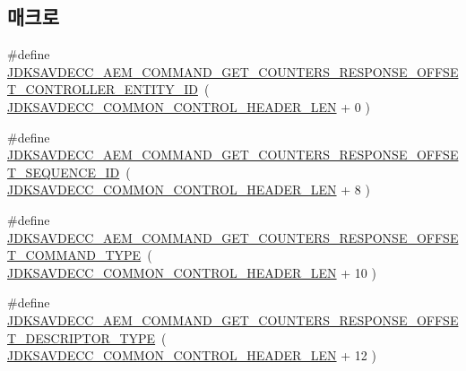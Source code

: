 \subsection*{매크로}
\begin{DoxyCompactItemize}
\item 
\#define \hyperlink{group__command__get__counters__response_gab36093ae45b6882f4b873a3584339793}{J\+D\+K\+S\+A\+V\+D\+E\+C\+C\+\_\+\+A\+E\+M\+\_\+\+C\+O\+M\+M\+A\+N\+D\+\_\+\+G\+E\+T\+\_\+\+C\+O\+U\+N\+T\+E\+R\+S\+\_\+\+R\+E\+S\+P\+O\+N\+S\+E\+\_\+\+O\+F\+F\+S\+E\+T\+\_\+\+C\+O\+N\+T\+R\+O\+L\+L\+E\+R\+\_\+\+E\+N\+T\+I\+T\+Y\+\_\+\+ID}~( \hyperlink{group__jdksavdecc__avtp__common__control__header_gaae84052886fb1bb42f3bc5f85b741dff}{J\+D\+K\+S\+A\+V\+D\+E\+C\+C\+\_\+\+C\+O\+M\+M\+O\+N\+\_\+\+C\+O\+N\+T\+R\+O\+L\+\_\+\+H\+E\+A\+D\+E\+R\+\_\+\+L\+EN} + 0 )
\item 
\#define \hyperlink{group__command__get__counters__response_ga980653ea2103cfe406aed83a1730905e}{J\+D\+K\+S\+A\+V\+D\+E\+C\+C\+\_\+\+A\+E\+M\+\_\+\+C\+O\+M\+M\+A\+N\+D\+\_\+\+G\+E\+T\+\_\+\+C\+O\+U\+N\+T\+E\+R\+S\+\_\+\+R\+E\+S\+P\+O\+N\+S\+E\+\_\+\+O\+F\+F\+S\+E\+T\+\_\+\+S\+E\+Q\+U\+E\+N\+C\+E\+\_\+\+ID}~( \hyperlink{group__jdksavdecc__avtp__common__control__header_gaae84052886fb1bb42f3bc5f85b741dff}{J\+D\+K\+S\+A\+V\+D\+E\+C\+C\+\_\+\+C\+O\+M\+M\+O\+N\+\_\+\+C\+O\+N\+T\+R\+O\+L\+\_\+\+H\+E\+A\+D\+E\+R\+\_\+\+L\+EN} + 8 )
\item 
\#define \hyperlink{group__command__get__counters__response_ga4104438c96333bb7b2daa5471881156c}{J\+D\+K\+S\+A\+V\+D\+E\+C\+C\+\_\+\+A\+E\+M\+\_\+\+C\+O\+M\+M\+A\+N\+D\+\_\+\+G\+E\+T\+\_\+\+C\+O\+U\+N\+T\+E\+R\+S\+\_\+\+R\+E\+S\+P\+O\+N\+S\+E\+\_\+\+O\+F\+F\+S\+E\+T\+\_\+\+C\+O\+M\+M\+A\+N\+D\+\_\+\+T\+Y\+PE}~( \hyperlink{group__jdksavdecc__avtp__common__control__header_gaae84052886fb1bb42f3bc5f85b741dff}{J\+D\+K\+S\+A\+V\+D\+E\+C\+C\+\_\+\+C\+O\+M\+M\+O\+N\+\_\+\+C\+O\+N\+T\+R\+O\+L\+\_\+\+H\+E\+A\+D\+E\+R\+\_\+\+L\+EN} + 10 )
\item 
\#define \hyperlink{group__command__get__counters__response_ga3a6ecc54be3c186574c2ba99a0fa2368}{J\+D\+K\+S\+A\+V\+D\+E\+C\+C\+\_\+\+A\+E\+M\+\_\+\+C\+O\+M\+M\+A\+N\+D\+\_\+\+G\+E\+T\+\_\+\+C\+O\+U\+N\+T\+E\+R\+S\+\_\+\+R\+E\+S\+P\+O\+N\+S\+E\+\_\+\+O\+F\+F\+S\+E\+T\+\_\+\+D\+E\+S\+C\+R\+I\+P\+T\+O\+R\+\_\+\+T\+Y\+PE}~( \hyperlink{group__jdksavdecc__avtp__common__control__header_gaae84052886fb1bb42f3bc5f85b741dff}{J\+D\+K\+S\+A\+V\+D\+E\+C\+C\+\_\+\+C\+O\+M\+M\+O\+N\+\_\+\+C\+O\+N\+T\+R\+O\+L\+\_\+\+H\+E\+A\+D\+E\+R\+\_\+\+L\+EN} + 12 )
\item 

\end{DoxyCompactItemize}

